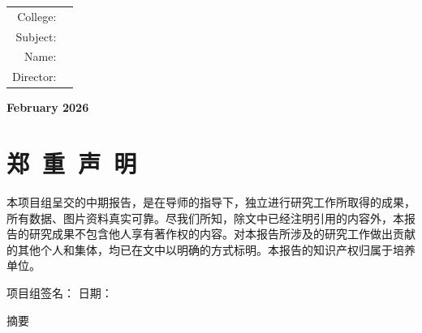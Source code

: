 \documentclass[UTF8,a4paper,zihao=-4]{ctexart}
\numberwithin{equation}{section}
\numberwithin{figure}{section}
\numberwithin{table}{section}
\begin{document}
\vspace{2cm}
\begin{center}
    \bfseries{}\selectfont{}
\begin{tabular}{rl}
College: &  \\
Subject: &  \\
Name: &  \\
Director: & \\
\end{tabular}
\end{center}

\vfill

\begin{center}
    \bfseries{}\selectfont{}
    February 2026
\end{center}

\newpage

\thispagestyle{empty}

\section*{\songti{} \textbf{郑\ 重\ 声\ 明}}
\vspace{2cm}

\songti{}
\linespread{1.5}\selectfont
本项目组呈交的中期报告，是在导师的指导下，独立进行研究工作所取得的成果，所有数据、图片资料真实可靠。尽我们所知，除文中已经注明引用的内容外，本报告的研究成果不包含他人享有著作权的内容。对本报告所涉及的研究工作做出贡献的其他个人和集体，均已在文中以明确的方式标明。本报告的知识产权归属于培养单位。

\vspace{3cm}

\begin{center}
项目组签名：\underline{\hspace{4cm}} \qquad 日期：\underline{\hspace{4cm}}
\end{center}

\newpage

\cleardoublepage
{}
\setcounter{page}{1}


\begin{center}
\heiti{} 摘\qquad 要
\end{center}
\end{document}

